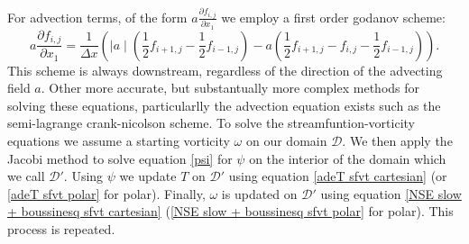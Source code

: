 \documentclass{article}
\begin{document}
For advection terms, of the form $a \frac{\partial f_{i,j}}{\partial x_1}$ we employ a first order godanov scheme:
\begin{equation}
	a \frac{\partial f_{i,j}}{\partial x_1} = \frac{1}{\Delta x} ( \mid a\mid (  \frac{1}{2} f_{i+1,j} - \frac{1}{2} f_{i-1,j}   ) - a ( \frac{1}{2} f_{i+1,j} -f_{i,j} - \frac{1}{2} f_{i-1,j} )).
\end{equation}
This scheme is always downstream, regardless of the direction of the advecting field $a$.
\newline
Other more accurate, but substantually more complex methods for solving these equations, particularlly the advection equation exists such as the semi-lagrange crank-nicolson scheme.
\newline
To solve the streamfuntion-vorticity equations we assume a starting vorticity $\omega$ on our domain $\mathcal{D}$. We then apply the Jacobi method to solve equation \ref{psi} for $\psi$ on the interior of the domain which we call $\mathcal{D}'$. 
Using $\psi$ we update $T$ on $\mathcal{D}'$ using equation \ref{adeT sfvt cartesian} (or \ref{adeT sfvt polar} for polar). Finally, $\omega$ is updated on $\mathcal{D}'$ using 
equation \ref{NSE slow + boussinesq sfvt cartesian} (\ref{NSE slow + boussinesq sfvt polar} for polar). This process is repeated.
\end{document}
